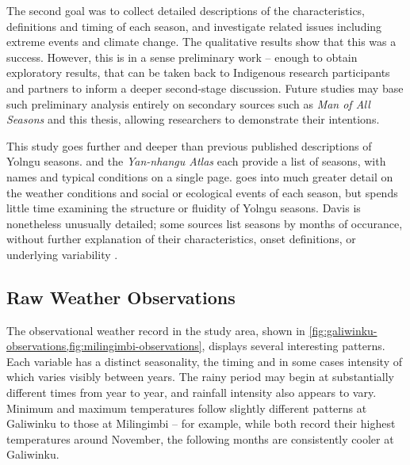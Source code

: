 The second goal was to collect detailed descriptions of the characteristics,
definitions and timing of each season, and investigate related issues
including extreme events and climate change.  The qualitative results
show that this was a success.  However, this is in a sense preliminary work --
enough to obtain exploratory results, that can be taken back to Indigenous
research participants and partners to inform a deeper second-stage discussion.  Future
studies may base such preliminary analysis entirely on secondary sources
such as \textit{Man of All Seasons} \citep{davis1989} and this thesis,
allowing researchers to demonstrate their intentions.


This study goes further and deeper than previous published descriptions of Yolngu seasons.
\citet{barber2005} and the \textit{Yan-nhangu Atlas} \citep{atlas2014} each
provide a list of seasons, with names and typical conditions on a single page.
\citet{davis1989} goes into much greater detail on the weather conditions and
social or ecological events of each season, but spends little time examining
the structure or fluidity of Yolngu seasons.  Davis is nonetheless unusually
detailed; some sources \citep[eg.][]{BOM-iwk} list seasons by months of
occurance, without further explanation of their characteristics,
onset definitions, or underlying variability .



\subsection{Raw Weather Observations}
\label{ssec:disc-weather}

The observational weather record in the study area, shown in
\cref{fig:galiwinku-observations,fig:milingimbi-observations}, displays
several interesting patterns.  Each variable has a distinct seasonality,
the timing and in some cases intensity of which varies visibly between years.
The rainy period may begin at substantially different times from year to year,
and rainfall intensity also appears to vary.
%
Minimum and maximum temperatures follow slightly different patterns at
Galiwinku to those at Milingimbi -- for example, while both record their
highest temperatures around November, the following months are consistently
cooler at Galiwinku.

